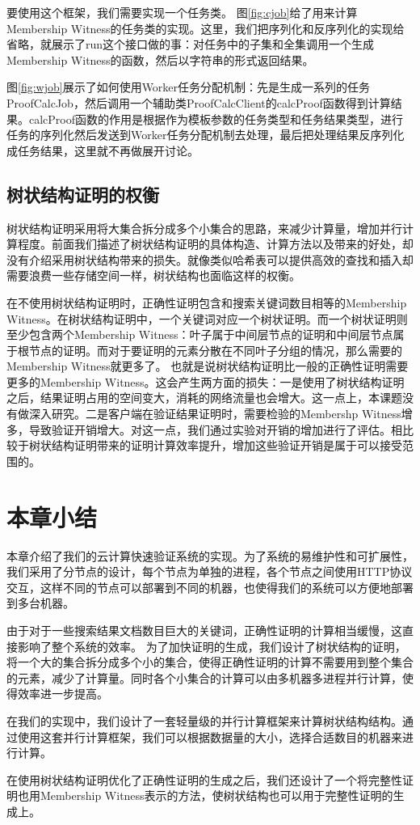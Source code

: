 要使用这个框架，我们需要实现一个任务类。
图\ref{fig:cjob}给了用来计算Membership Witness的任务类的实现。这里，我们把序列化和反序列化的实现给省略，就展示了run这个接口做的事：对任务中的子集和全集调用一个生成Membership Witness的函数，然后以字符串的形式返回结果。


图\ref{fig:wjob}展示了如何使用Worker任务分配机制：先是生成一系列的任务ProofCalcJob，然后调用一个辅助类ProofCalcClient的calcProof函数得到计算结果。calcProof函数的作用是根据作为模板参数的任务类型和任务结果类型，进行任务的序列化然后发送到Worker任务分配机制去处理，最后把处理结果反序列化成任务结果，这里就不再做展开讨论。
\subsection{树状结构证明的权衡}
树状结构证明采用将大集合拆分成多个小集合的思路，来减少计算量，增加并行计算程度。前面我们描述了树状结构证明的具体构造、计算方法以及带来的好处，却没有介绍采用树状结构带来的损失。就像类似哈希表可以提供高效的查找和插入却需要浪费一些存储空间一样，树状结构也面临这样的权衡。

在不使用树状结构证明时，正确性证明包含和搜索关键词数目相等的Membership Witness。在树状结构证明中，一个关键词对应一个树状证明。而一个树状证明则至少包含两个Membership Witness：叶子属于中间层节点的证明和中间层节点属于根节点的证明。而对于要证明的元素分散在不同叶子分组的情况，那么需要的Membership Witness就更多了。
也就是说树状结构证明比一般的正确性证明需要更多的Membership Witness。这会产生两方面的损失：一是使用了树状结构证明之后，结果证明占用的空间变大，消耗的网络流量也会增大。这一点上，本课题没有做深入研究。二是客户端在验证结果证明时，需要检验的Membershp Witness增多，导致验证开销增大。对这一点，我们通过实验对开销的增加进行了评估。相比较于树状结构证明带来的证明计算效率提升，增加这些验证开销是属于可以接受范围的。

\section{本章小结}
本章介绍了我们的云计算快速验证系统的实现。为了系统的易维护性和可扩展性，我们采用了分节点的设计，每个节点为单独的进程，各个节点之间使用HTTP协议交互，这样不同的节点可以部署到不同的机器，也使得我们的系统可以方便地部署到多台机器。

由于对于一些搜索结果文档数目巨大的关键词，正确性证明的计算相当缓慢，这直接影响了整个系统的效率。
为了加快证明的生成，我们设计了树状结构的证明，将一个大的集合拆分成多个小的集合，使得正确性证明的计算不需要用到整个集合的元素，减少了计算量。同时各个小集合的计算可以由多机器多进程并行计算，使得效率进一步提高。

在我们的实现中，我们设计了一套轻量级的并行计算框架来计算树状结构结构。通过使用这套并行计算框架，我们可以根据数据量的大小，选择合适数目的机器来进行计算。

在使用树状结构证明优化了正确性证明的生成之后，我们还设计了一个将完整性证明也用Membership Witness表示的方法，使树状结构也可以用于完整性证明的生成上。
